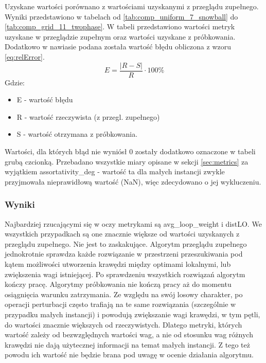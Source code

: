 Uzyskane wartości porównano z wartościami uzyskanymi z przeglądu zupełnego.
Wyniki przedstawiono w tabelach od \ref{tab:comp_uniform_7_snowball} do \ref{tab:comp_grid_11_twophase}.
W tabeli przedstawiono wartości metryk uzyskane w przeglądzie zupełnym oraz wartości uzyskane z próbkowania.
Dodatkowo w nawiasie podana została wartość błędu obliczona z wzoru \ref{eq:relError}.
\begin{equation}
    \label{eq:relError}
    E = \frac{|R - S|}{R} \cdot 100\%
\end{equation}
Gdzie:
\begin{itemize}
    \item E - wartość błędu
    \item R - wartość rzeczywista (z przegl. zupełnego)
    \item S - wartość otrzymana z próbkowania.
\end{itemize}

Wartości, dla których błąd nie wyniósł 0 zostały dodatkowo oznaczone w tabeli grubą czcionką.
Przebadano wszystkie miary opisane w sekcji \ref{sec:metrics} za wyjątkiem assortativity\_deg - wartość ta dla małych instancji zwykle przyjmowała
nieprawidłową wartość (NaN), więc zdecydowano o jej wykluczeniu.

\subsubsection{Wyniki}



Najbardziej rzucającymi się w oczy metrykami są avg\_loop\_weight i distLO.
We wszystkich przypadkach są one znacznie większe od wartości uzyskanych z przeglądu zupełnego.
Nie jest to zaskakujące. Algorytm przeglądu zupełnego jednokrotnie sprawdza każde rozwiązanie w przestrzeni przeszukiwania pod kątem
możliwości utworzenia krawędzi między optimami lokalnymi, lub zwiększenia wagi istniejącej.
Po sprawdzeniu wszystkich rozwiązań algorytm kończy pracę.
Algorytmy próbkowania nie kończą pracy aż do momentu osiągnięcia warunku zatrzymania.
Ze względu na swój losowy charakter, po operacji perturbacji często trafiają na te same rozwiązania
(szczególnie w przypadku małych instancji) i powodują zwiększanie wagi krawędzi, w tym pętli, do wartości znacznie większych od rzeczywistych.
Dlatego metryki, których wartość zależy od bezwzględnych wartości wag, a nie od stosunku wag różnych krawędzi nie dają użytecznej informacji na temat małych instancji.
Z tego też powodu ich wartość nie będzie brana pod uwagę w ocenie działania algorytmu.

